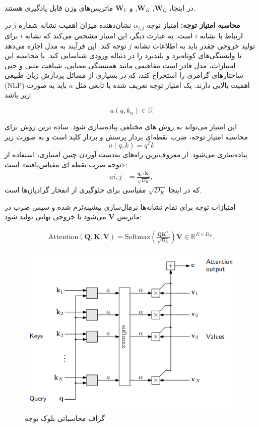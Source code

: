 در اینجا، $\mathbf{W}_Q$, $\mathbf{W}_K$, و $\mathbf{W}_V$ ماتریس‌های وزن قابل یادگیری هستند.

\textbf{محاسبه امتیاز توجه:} 
امتیاز توجه $\alpha_{i,j}$ نشان‌دهنده میزان اهمیت  نشانه%
شماره $j$ در ارتباط با نشانه $i$ است. به عبارت دیگر، این امتیاز مشخص می‌کند که نشانه $i$ برای تولید خروجی چقدر باید به اطلاعات نشانه $j$ توجه کند. این فرآیند به مدل اجازه می‌دهد تا وابستگی‌های کوتاه‌برد و بلند‌برد را در دنباله ورودی شناسایی کند. با محاسبه این امتیازات، مدل قادر است مفاهیمی مانند همبستگی معنایی، شباهت متنی و حتی ساختارهای گرامری را استخراج کند، که در بسیاری از مسائل پردازش زبان طبیعی (NLP) اهمیت بالایی دارند. یک امتیاز توجه تعریف شده با تابعی مثل $a$ باید به صورت زیر باشد:

$$
a(q,k_n) \in \mathbb{R}
$$

این امتیاز می‌تواند به روش های مختلفی پیاده‌سازی شود. ساده ترین روش برای محاسبه امتیاز توجه، ضرب نقطه‌ای بردار پرسش و بردار کلید است و  به صورت زیر
$$
a(q,k) = q^{T}k
$$
پیاده‌سازی می‌شود. از معروف‌ترین راه‌های به‌دست آوردن چنین امتیازی، استفاده از «توجه ضرب نقطه ای مقیاس‌یافته»%
است:
\begin{align*} 
	a{i,j} &= \frac{\mathbf{q}_i \cdot \mathbf{k}_j}{\sqrt{D_K}},
\end{align*}
که در اینجا $\sqrt{D_K}$ مقیاسی برای جلوگیری از انفجار گرادیان‌ها است.

امتیازات توجه برای تمام نشانه‌ها نرمال‌سازی بیشینه‌نَرم%
شده و سپس ضرب در ماتریس $\mathbf{V}$ می‌شود تا خروجی نهایی تولید شود:


\begin{align}
	\text{Attention}(\mathbf{Q}, \mathbf{K}, \mathbf{V}) = \text{Softmax}\left(\frac{\mathbf{Q} \mathbf{K}^\top}{\sqrt{D_K}}\right) \mathbf{V} \in \mathbb{R}^{N \times D_K}.
\end{align}

\begin{figure}
	\centering
	\includegraphics[width=0.7\linewidth]{figs/attnCompGraph}
	\caption{گراف محاسباتی بلوک توجه}
	\label{fig:attncompgraph}
\end{figure}


